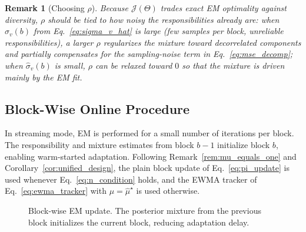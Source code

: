 ﻿\documentclass[12pt,a4paper]{article}
\newtheorem{remark}{Remark}
\begin{document}
\begin{remark}[Choosing $\rho$]
Because $\mathcal J(\Theta)$ trades exact EM optimality against diversity,
$\rho$ should be tied to how noisy the responsibilities already are: when
$\hat\sigma_v(b)$ from Eq.~\eqref{eq:sigma_v_hat} is large (few samples per
block, unreliable responsibilities), a larger $\rho$ regularizes the mixture
toward decorrelated components and partially compensates for the
sampling-noise term in Eq.~\eqref{eq:mse_decomp}; when $\hat\sigma_v(b)$ is
small, $\rho$ can be relaxed toward $0$ so that the mixture is driven mainly
by the EM fit.
\end{remark}

\subsection{Block-Wise Online Procedure}
In streaming mode, EM is performed for a small number of iterations per
block. The responsibility and mixture estimates from block $b-1$ initialize
block $b$, enabling warm-started adaptation. Following
Remark~\ref{rem:mu_equals_one} and Corollary~\ref{cor:unified_design}, the
plain block update of Eq.~\eqref{eq:pi_update} is used whenever
Eq.~\eqref{eq:n_condition} holds, and the EWMA tracker of
Eq.~\eqref{eq:ewma_tracker} with $\mu=\hat\mu^\star$ is used otherwise.

\begin{figure}[H]
\centering
{}
\caption{Block-wise EM update. The posterior mixture from the previous block
initializes the current block, reducing adaptation delay.}
\label{fig:blockwise_em}
\end{figure}
\end{document}
